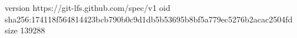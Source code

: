 version https://git-lfs.github.com/spec/v1
oid sha256:174118f564814423bcb790b0c9d1db5b53695b8bf5a779ec5276b2acac2504fd
size 139288
